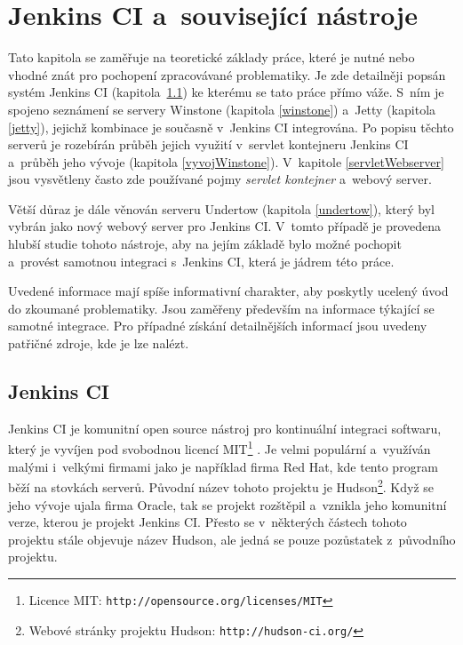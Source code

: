 \chapter{Jenkins CI a~související nástroje}
    Tato kapitola se zaměřuje na teoretické základy práce, které je nutné nebo vhodné znát pro pochopení zpracovávané problematiky.
    Je zde detailněji popsán systém Jenkins CI (kapitola~\ref{jenkins}) ke kterému se tato práce přímo váže. S~ním je spojeno seznámení
    se servery Winstone (kapitola \ref{winstone}) a~Jetty (kapitola \ref{jetty}), jejichž kombinace je současně v~Jenkins CI integrována.
    Po popisu těchto serverů je rozebírán průběh jejich využití v~servlet kontejneru Jenkins CI a~průběh jeho vývoje (kapitola \ref{vyvojWinstone}). 
    V~kapitole \ref{servletWebserver} jsou vysvětleny často zde používané pojmy \emph{servlet kontejner} a~webový server.

    Větší důraz je dále věnován serveru Undertow (kapitola \ref{undertow}), který byl vybrán jako nový webový server pro Jenkins CI. V~tomto případě je provedena hlubší studie
    tohoto nástroje, aby na jejím základě bylo možné pochopit a~provést samotnou integraci s~Jenkins CI, která je jádrem této práce. 

    Uvedené informace mají spíše informativní charakter, aby poskytly ucelený úvod do zkoumané problematiky. Jsou zaměřeny především na informace týkající se samotné
    integrace. Pro případné získání detailnějších informací jsou uvedeny patřičné zdroje, kde je lze nalézt.

    \section {Jenkins CI} \label{jenkins}
        Jenkins CI je komunitní open source nástroj pro kontinuální integraci softwaru, který je vyvíjen pod svobodnou licencí
        MIT\footnote{Licence MIT: \texttt{http://opensource.org/licenses/MIT}} \cite{jenkinsGovernance}.
        Je velmi populární a~využíván malými i~velkými firmami jako je například firma Red Hat, kde tento program běží na stovkách serverů.
        Původní název tohoto projektu je Hudson\footnote{Webové stránky projektu Hudson: \texttt{http://hudson-ci.org/}}. 
        Když se jeho vývoje ujala firma Oracle, tak se projekt
        rozštěpil a~vznikla jeho komunitní verze, kterou je projekt Jenkins CI. Přesto se v~některých částech tohoto projektu 
        stále objevuje název Hudson, ale jedná se pouze pozůstatek z~původního projektu.

